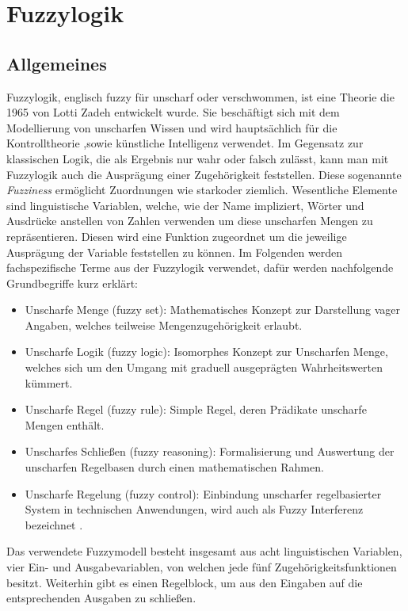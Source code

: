 \section{Fuzzylogik}
\subsection{Allgemeines}
Fuzzylogik, englisch fuzzy für unscharf oder verschwommen, ist eine Theorie die 1965 von Lotti Zadeh entwickelt wurde. Sie beschäftigt sich mit dem Modellierung von unscharfen Wissen und wird hauptsächlich für die Kontrolltheorie ,sowie künstliche Intelligenz verwendet. Im Gegensatz zur klassischen Logik, die als Ergebnis nur wahr oder falsch zulässt, kann man mit Fuzzylogik auch die Ausprägung einer Zugehörigkeit feststellen. Diese sogenannte \textit{Fuzziness} ermöglicht Zuordnungen wie \grqq stark\grqq \space oder \grqq ziemlich\grqq. Wesentliche Elemente sind linguistische Variablen, welche, wie der Name impliziert, Wörter und Ausdrücke anstellen von Zahlen verwenden um diese unscharfen Mengen zu repräsentieren. Diesen wird eine Funktion zugeordnet um die jeweilige Ausprägung der Variable feststellen zu können.\cite{fuzzylogik} \newline
Im Folgenden werden fachspezifische Terme aus der Fuzzylogik verwendet, dafür werden nachfolgende Grundbegriffe kurz erklärt:
\begin{itemize}
	\item Unscharfe Menge (fuzzy set): Mathematisches Konzept zur Darstellung vager Angaben, welches teilweise Mengenzugehörigkeit erlaubt.\cite{fuzzybook}\cite{WissensbasierteSysteme}
	\item Unscharfe Logik (fuzzy logic): Isomorphes Konzept zur Unscharfen Menge, welches sich um den Umgang mit graduell ausgeprägten Wahrheitswerten kümmert.\cite{fuzzybook}\cite{WissensbasierteSysteme}
	\item Unscharfe Regel (fuzzy rule): Simple Regel, deren Prädikate unscharfe Mengen enthält.\cite{fuzzybook}\cite{WissensbasierteSysteme}
	\item Unscharfes Schließen (fuzzy reasoning): Formalisierung und Auswertung der unscharfen Regelbasen durch einen mathematischen Rahmen.\cite{fuzzybook}\cite{WissensbasierteSysteme}
	\item Unscharfe Regelung (fuzzy control): Einbindung unscharfer regelbasierter System in technischen Anwendungen, wird auch als Fuzzy Interferenz bezeichnet \cite{fuzzybook}\cite{WissensbasierteSysteme}. 
\end{itemize}
Das verwendete Fuzzymodell besteht insgesamt aus acht linguistischen Variablen, vier Ein- und Ausgabevariablen, von welchen jede fünf Zugehörigkeitsfunktionen besitzt. Weiterhin gibt es einen Regelblock, um aus den Eingaben auf die entsprechenden Ausgaben zu schließen.

